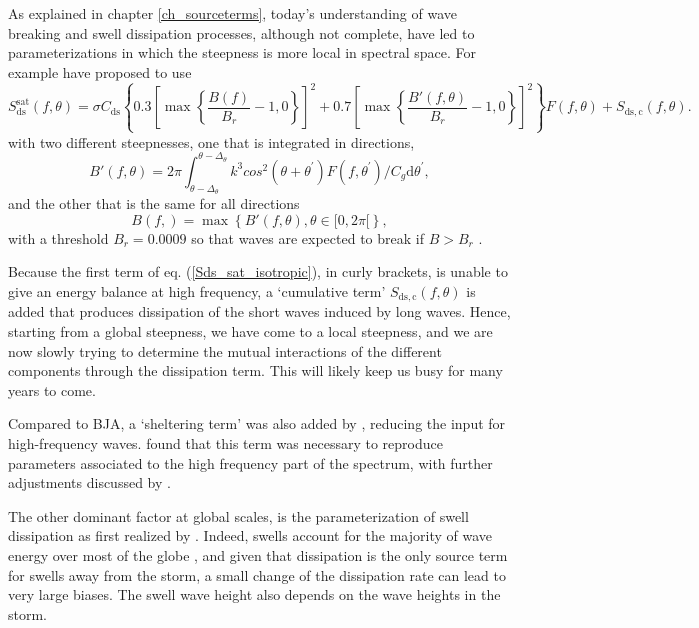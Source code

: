 As explained in chapter \ref{ch_sourceterms}, today's understanding of wave breaking and swell dissipation processes, 
although not complete, have led to parameterizations in which the steepness is more local in spectral space. 
For example \cite{Ardhuin&al.2010} have proposed to use 
\begin{equation}
S_{\mathrm{ds}}^{\mathrm{sat}} (f,\theta) =  \sigma
 C_{\mathrm{ds}} \left\{ 0.3
\left[\max\left\{\frac{B\left(f\right)}{B_r} -
1,0\right\}\right]^2  + 0.7
\left[\max\left\{\frac{B'\left(f,\theta \right)}{B_r} -1
 ,0\right\}\right]^2\right\}  F(f,\theta)  + S_{\mathrm{ds,c}}(f,\theta) \label{Sds_sat_isotropic}.
\end{equation}
with two different steepnesses, one that is integrated in directions, 
\begin{equation}
B'\left(f,\theta\right)=2 \pi
\int_{\theta-\Delta_\theta}^{\theta-\Delta_\theta} k^3
cos^2\left(\theta+ \theta^{\prime}\right) F(f,\theta^{\prime})/C_g
\mathrm d \theta^{\prime} \label{defBofkprime2},
\end{equation}
and the other that is the same for all directions
\begin{equation}
B\left(f,\right)=\max\left\{B'(f,\theta), \theta \in [0,2
\pi[\right\} \label{defBof},
\end{equation}
with a threshold $B_r = 0.0009$ so that waves are expected to break if 
$B > B_r$ \citep{Banner&al.2000,Banner&al.2002}.

Because the first term of eq. (\ref{Sds_sat_isotropic}), in curly brackets, is unable to give an energy balance 
at high frequency, a `cumulative term' $S_{\mathrm{ds,c}}(f,\theta)$ is added that produces dissipation of the short 
waves induced by long waves. Hence, starting from a global steepness, we have come to a local steepness, and we are now 
slowly trying to determine the mutual interactions of the different components through the dissipation term. This will 
likely keep us busy for many years to come. 

Compared to BJA, a `sheltering term' was also added by \cite{Banner&Morison2006,Banner&Morison2010}, reducing the 
input for high-frequency waves. \cite{Ardhuin&al.2008d} found that this term was necessary to reproduce parameters
associated to the high frequency part of the spectrum, with further adjustments discussed by \cite{Rascle&Ardhuin2013}.

The other dominant factor at global scales, is the parameterization of swell dissipation as first realized by 
\cite{Tolman2002e}. Indeed, swells account for the majority of wave energy over most of the globe \citep{Chen&al.2002}, 
and given that dissipation is the only source term for swells away from the storm, a small change of the dissipation rate
can lead to very large biases. The swell wave height also depends on the wave heights in the storm. 

